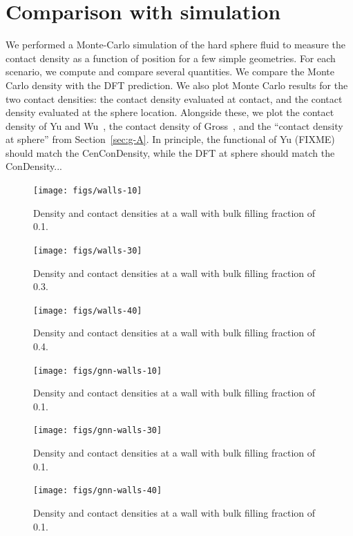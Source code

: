 \documentclass[letterpaper,twocolumn,amsmath,amssymb,jcp,10pt,aip]{revtex4-1}
\begin{document}
\section{Comparison with simulation}

We performed a Monte-Carlo simulation of the hard sphere fluid to
measure the contact density as a function of position for a few simple
geometries.  For each scenario, we compute and compare several
quantities.  We compare the Monte Carlo density with the DFT
prediction.  We also plot Monte Carlo results for the two contact
densities: the contact density evaluated at contact, and the contact
density evaluated at the sphere location.  Alongside these, we plot
the contact density of Yu and
Wu~\cite{yu2002fmt-dft-inhomogeneous-associating}, the contact density
of Gross~\cite{gross2009density}, and the ``contact density at
sphere'' from Section~\ref{sec:g-A}.  In principle, the
functional of Yu (FIXME) should match the CenConDensity, while the DFT
at sphere should match the ConDensity...

\begin{figure}
  \texttt{[image: figs/walls-10]}
  \caption{Density and contact densities at a wall with bulk filling
    fraction of 0.1.}
  \label{fig:walls-10}
\end{figure}

\begin{figure}
  \texttt{[image: figs/walls-30]}
  \caption{Density and contact densities at a wall with bulk filling
    fraction of 0.3.}
  \label{fig:walls-30}
\end{figure}

\begin{figure}
  \texttt{[image: figs/walls-40]}
  \caption{Density and contact densities at a wall with bulk filling
    fraction of 0.4.}
  \label{fig:walls-40}
\end{figure}

\begin{figure}
  \texttt{[image: figs/gnn-walls-10]}
  \caption{Density and contact densities at a wall with bulk filling
    fraction of 0.1.}
  \label{fig:gnn-walls-10}
\end{figure}

\begin{figure}
  \texttt{[image: figs/gnn-walls-30]}
  \caption{Density and contact densities at a wall with bulk filling
    fraction of 0.1.}
  \label{fig:gnn-walls-30}
\end{figure}

\begin{figure}
  \texttt{[image: figs/gnn-walls-40]}
  \caption{Density and contact densities at a wall with bulk filling
    fraction of 0.1.}
  \label{fig:gnn-walls-10}
\end{figure}
\end{document}
